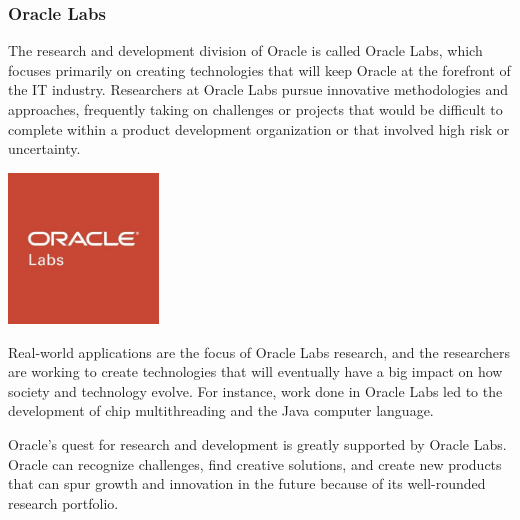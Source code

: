 \subsubsection{Oracle Labs}
The research and development division of Oracle is called Oracle Labs, which focuses primarily on creating technologies that will keep Oracle at the forefront of the IT industry. Researchers at Oracle Labs pursue innovative methodologies and approaches, frequently taking on challenges or projects that would be difficult to complete within a product development organization or that involved high risk or uncertainty. \mynewline
\begin{center}
    \centering
    \includegraphics[width=0.3\textwidth]{Images/oracle_labs_logo.jpg}
     \cite{oracle-labs}
    \label{fig:labs}
\end{center}

Real-world applications are the focus of Oracle Labs research, and the researchers are working to create technologies that will eventually have a big impact on how society and technology evolve. For instance, work done in Oracle Labs led to the development of chip multithreading and the Java computer language.\mynewline

Oracle's quest for research and development is greatly supported by Oracle Labs. Oracle can recognize challenges, find creative solutions, and create new products that can spur growth and innovation in the future because of its well-rounded research portfolio.

